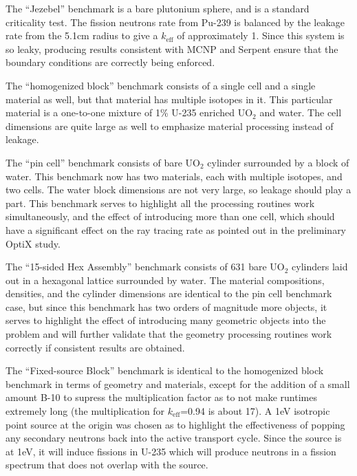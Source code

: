 The ``Jezebel'' benchmark is a bare plutonium sphere, and is a standard criticality test.   The fission neutrons rate from Pu-239 is balanced by the leakage rate from the 5.1cm radius to give a $k_\mathrm{eff}$ of approximately 1.  Since this system is so leaky, producing results consistent with MCNP and Serpent ensure that the boundary conditions are correctly being enforced.  

The ``homogenized block'' benchmark consists of a single cell and a single material as well, but that material has multiple isotopes in it.  This particular material is a one-to-one mixture of 1\% U-235 enriched UO$_2$ and water.  The cell dimensions are quite large as well to emphasize material processing instead of leakage.

The ``pin cell'' benchmark consists of bare UO$_2$ cylinder surrounded by a block of water.  This benchmark now has two materials, each with multiple isotopes, and two cells.  The water block dimensions are not very large, so leakage should play a part.  This benchmark serves to highlight all the processing routines work simultaneously, and the effect of introducing more than one cell, which should have a significant effect on the ray tracing rate as pointed out in the preliminary OptiX study.

The ``15-sided Hex Assembly'' benchmark consists of 631 bare UO$_2$ cylinders laid out in a hexagonal lattice surrounded by water.  The material compositions, densities, and the cylinder dimensions are identical to the pin cell benchmark case, but since this benchmark has two orders of magnitude more objects, it serves to highlight the effect of introducing many geometric objects into the problem and will further validate that the geometry processing routines work correctly if consistent results are obtained.

The ``Fixed-source Block'' benchmark is identical to the homogenized block benchmark in terms of geometry and materials, except for the addition of a small amount B-10 to supress the multiplication factor as to not make runtimes extremely long (the multiplication for $k_\mathrm{eff}$=0.94 is about 17).   A 1eV isotropic point source at the origin was chosen as to highlight the effectiveness of popping any secondary neutrons back into the active transport cycle.  Since the source is at 1eV, it will induce fissions in U-235 which will produce neutrons in a fission spectrum that does not overlap with the source.  

